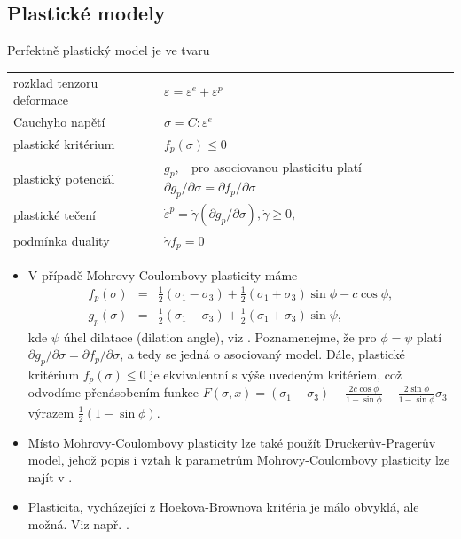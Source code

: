 \documentclass{article}
\newcommand{\alert}[1]{{\color{red}#1}}
\begin{document}
\subsection{Plastické modely}
\alert{Perfektně} plastický model je ve tvaru
\begin{table}[ht]
	\centering
	\begin{tabular}{ll}
		\hline
		rozklad tenzoru deformace & $\varepsilon = \varepsilon^e + \varepsilon^p$\\
		Cauchyho napětí & $\sigma = C : \varepsilon^e$\\
		\alert{plastické kritérium} & \alert{$f_p(\sigma)\leq0$}\\
		plastický potenciál & $g_p,\;\;$ \alert{pro asociovanou plasticitu platí} $\partial g_p/\partial \sigma = \partial f_p/\partial \sigma$  \\
		plastické tečení & \alert{$\dot{\varepsilon}^p = \dot{\gamma}(\partial g_p/\partial \sigma), \dot\gamma \geq 0$,}\\
		podmínka duality & $\dot{\gamma} f_p =0$\\
		\hline
	\end{tabular}
\end{table}

\begin{itemize}
	\item V případě Mohrovy-Coulombovy plasticity máme
	\begin{eqnarray*}
		f_p(\sigma) &=& \frac{1}{2} (\sigma_1 - \sigma_3) + \frac{1}{2} (\sigma_1 + \sigma_3)\sin \phi - c \cos \phi, \\
		g_p(\sigma) &=& \frac{1}{2} (\sigma_1 - \sigma_3) + \frac{1}{2} (\sigma_1 + \sigma_3)\sin \psi,
	\end{eqnarray*}
	\alert{kde $\psi$ úhel dilatace (dilation angle), viz \cite{Neto2011}. Poznamenejme, že pro $\phi = \psi$ platí $\partial g_p/\partial \sigma = \partial f_p/\partial \sigma$, a tedy se jedná o asociovaný model. Dále, plastické kritérium $f_p(\sigma)\leq0$ je ekvivalentní s výše uvedeným kritériem, což odvodíme přenásobením funkce
	$F(\sigma, x) = (\sigma_1 - \sigma_3) - \frac{2c\cos \phi}{1-\sin \phi} - \frac{2\sin \phi}{1-\sin \phi} \sigma_3$ výrazem $\frac{1}{2}(1 - \sin \phi)$.}
	\item Místo Mohrovy-Coulombovy plasticity lze také použít Druckerův-Pragerův model, jehož popis i vztah k parametrům Mohrovy-Coulombovy plasticity lze najít v \cite{Neto2011}. 
	\item Plasticita, vycházející z Hoekova-Brownova kritéria je málo obvyklá, ale možná. Viz např. \cite{Carranza-Torres1999}.
\end{itemize}
\end{document}
